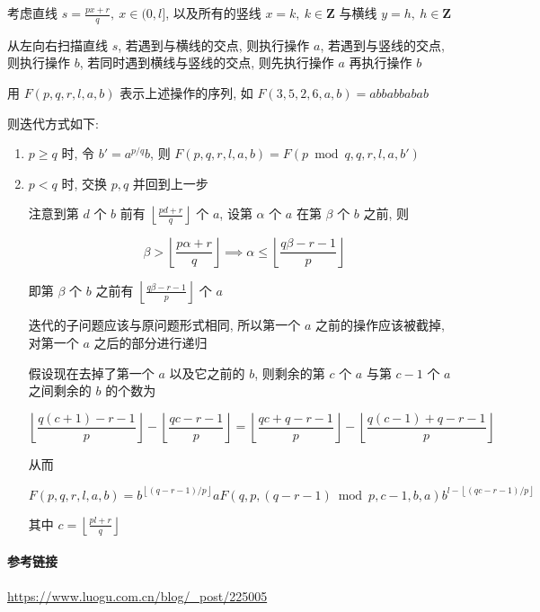 考虑直线 \(s=\frac{px+r}{q},~x\in (0,l]\), 以及所有的竖线 \(x=k,~k\in\mathbf{Z}\) 与横线 \(y=h,~h\in\mathbf{Z}\)

从左向右扫描直线 \(s\), 若遇到与横线的交点, 则执行操作 \(a\), 若遇到与竖线的交点, 则执行操作 \(b\), 若同时遇到横线与竖线的交点, 则先执行操作 \(a\) 再执行操作 \(b\)

用 \(F(p,q,r,l,a,b)\) 表示上述操作的序列, 如 \(F(3,5,2,6,a,b)=abbabbabab\)

则迭代方式如下:

\begin{enumerate}
    \item \(p\geq q\) 时, 令 \(b'=a^{p/q}b\), 则 \(F(p,q,r,l,a,b)=F(p\bmod q,q,r,l,a,b')\)
    \item \(p<q\) 时, 交换 \(p,q\) 并回到上一步

          注意到第 \(d\) 个 \(b\) 前有 \(\left\lfloor\frac{pd+r}{q}\right\rfloor\) 个 \(a\), 设第 \(\alpha\) 个 \(a\) 在第 \(\beta\) 个 \(b\) 之前, 则

          \[
              \beta > \left\lfloor\frac{p\alpha+r}{q}\right\rfloor \implies \alpha \leq \left\lfloor\frac{q\beta-r-1}{p}\right\rfloor
          \]

          即第 \(\beta\) 个 \(b\) 之前有 \(\left\lfloor\frac{q\beta-r-1}{p}\right\rfloor\) 个 \(a\)

          迭代的子问题应该与原问题形式相同, 所以第一个 \(a\) 之前的操作应该被截掉, 对第一个 \(a\) 之后的部分进行递归

          假设现在去掉了第一个 \(a\) 以及它之前的 \(b\), 则剩余的第 \(c\) 个 \(a\) 与第 \(c-1\) 个 \(a\) 之间剩余的 \(b\) 的个数为

          \[
              \left\lfloor\frac{q(c+1)-r-1}{p}\right\rfloor-\left\lfloor\frac{qc-r-1}{p}\right\rfloor=\left\lfloor\frac{qc+q-r-1}{p}\right\rfloor-\left\lfloor\frac{q(c-1)+q-r-1}{p}\right\rfloor
          \]

          从而
          
          \[
              F(p,q,r,l,a,b)=b^{\left\lfloor (q-r-1)/p \right\rfloor}aF(q,p,(q-r-1)\bmod p,c-1,b,a)b^{l-\left\lfloor (qc-r-1)/p \right\rfloor}
          \]

          其中 \(c=\left\lfloor\frac{pl+r}{q}\right\rfloor\)
\end{enumerate}

\paragraph{参考链接}

\url{https://www.luogu.com.cn/blog/_post/225005}

